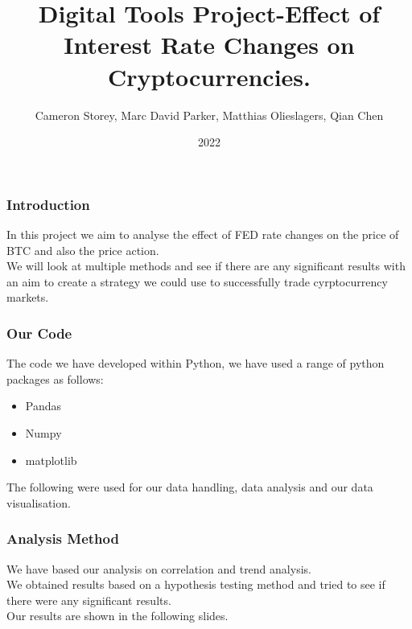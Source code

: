 \documentclass{beamer}
\title{Digital Tools Project-Effect of Interest Rate Changes on Cryptocurrencies.}
\author{Cameron Storey, Marc David Parker, Matthias Olieslagers, Qian Chen}
\institute{UZH Digital Tools for Finance}
\date{2022}
\begin{document}
\frame{\titlepage}

\begin{frame}
\frametitle{Introduction}
In this project we aim to analyse the effect of FED rate changes on the price of BTC and also the price action.\\


We will look at multiple methods and see if there are any significant results with an aim to create a strategy we could use to successfully trade cyrptocurrency markets.
\end{frame}

\begin{frame}
    \frametitle{Our Code}
    The code we have developed within Python, we have used a range of python packages as follows:
    \begin{itemize}
    \item Pandas
    \item Numpy
    \item matplotlib
\end{itemize}
The following were used for our data handling, data analysis and our data visualisation.
\end{frame}
\begin{frame}
\frametitle{Analysis Method}
We have based our analysis on correlation and trend analysis.\\

We obtained results based on a hypothesis testing method and tried to see if there were any significant results.\\

Our results are shown in the following slides.
\end{frame}
\end{document}
